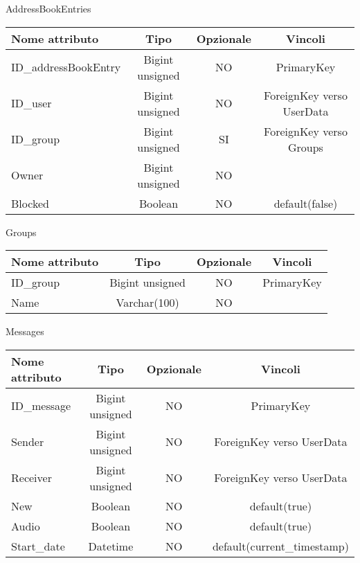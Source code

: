 \begin{center}
AddressBookEntries

\begin{center}
\begin{tabular}{lccc}
\toprule
Nome attributo & Tipo & Opzionale & Vincoli\\
\midrule
ID\_addressBookEntry & Bigint unsigned & NO & PrimaryKey\\
ID\_user & Bigint unsigned & NO & ForeignKey verso UserData\\
ID\_group & Bigint unsigned & SI & ForeignKey verso Groups\\
Owner & Bigint unsigned & NO & \\
Blocked & Boolean & NO & default(false)\\
\bottomrule
\end{tabular}
\end{center}

Groups

\begin{center}
\begin{tabular}{lccc}
\toprule
Nome attributo & Tipo & Opzionale & Vincoli\\
\midrule
ID\_group & Bigint unsigned & NO & PrimaryKey\\
Name & Varchar(100) & NO & \\
\bottomrule
\end{tabular}
\end{center}	

Messages

\begin{center}
\begin{tabular}{lccc}
\toprule
Nome attributo & Tipo & Opzionale & Vincoli\\
\midrule
ID\_message & Bigint unsigned & NO & PrimaryKey\\
Sender & Bigint unsigned & NO & ForeignKey verso UserData \\
Receiver & Bigint unsigned & NO & ForeignKey verso UserData\\
New & Boolean & NO & default(true)\\
Audio & Boolean & NO & default(true)\\
Start\_date & Datetime & NO & default(current\_timestamp)\\
\bottomrule
\end{tabular}	
\end{center}

\end{center}

